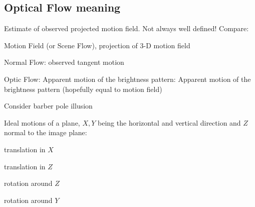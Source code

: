 \begin{compactdesc}
		\section{Optical Flow meaning}
		Estimate of observed projected motion field. Not always well defined! Compare:
		\begin{enumerate*}[label=\protect\circled{\arabic*},itemjoin=]
			\item Motion Field (or Scene Flow), projection of 3-D motion field\\
			\item Normal Flow: observed tangent motion\\
			\item Optic Flow: Apparent motion of the brightness pattern: Apparent motion of the brightness pattern (hopefully equal to motion field)\\
			\item Consider barber pole illusion
		\end{enumerate*}
	\item[\lp{Planar motion}]
		Ideal motions of a plane, $X,Y$ being the horizontal and vertical direction and $Z$ normal to the image plane:\\
		\begin{enumerate*}[label=\protect\circled{\arabic*},itemjoin=]
			\item translation in $X$\\
			\item translation in $Z$\\
			\item rotation around $Z$\\
			\item rotation around $Y$\\
		\end{enumerate*}

\end{compactdesc}
